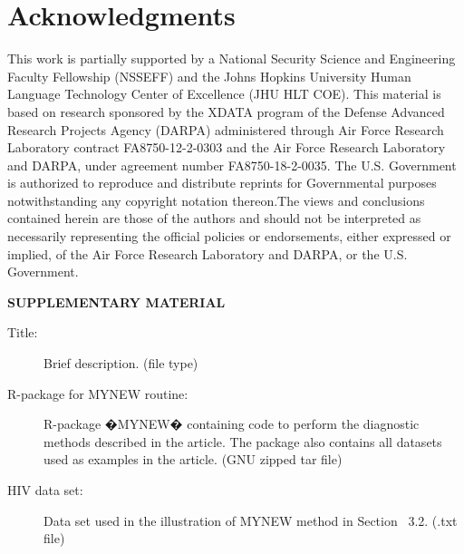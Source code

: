 \documentclass[12pt]{article}
\numberwithin{equation}{section}
\theoremstyle{definition}
\begin{document}
\section{Acknowledgments}
This work is partially supported by a
National Security Science and Engineering Faculty Fellowship (NSSEFF)
and the
Johns Hopkins University Human Language Technology Center of Excellence
(JHU HLT COE).
This material is based on research sponsored by the XDATA program of the
Defense Advanced Research Projects Agency (DARPA) administered through
Air Force Research Laboratory contract FA8750-12-2-0303 and the Air
Force Research Laboratory and DARPA, under agreement number FA8750-18-2-0035. 
The U.S. Government is authorized to reproduce and distribute reprints
for Governmental purposes notwithstanding any copyright notation
thereon.The views and conclusions contained herein are those of the
authors and should not be interpreted as necessarily representing the
official policies or endorsements, either expressed or implied, of the
Air Force Research Laboratory and DARPA, or the U.S. Government.
\newpage

\bigskip
\begin{center}
{\large\bf SUPPLEMENTARY MATERIAL}
\end{center}

\begin{description}

\item[Title:] Brief description. (file type)

\item[R-package for  MYNEW routine:] R-package �MYNEW� containing code to perform the diagnostic methods described in the article. The package also contains all datasets used as examples in the article. (GNU zipped tar file)

\item[HIV data set:] Data set used in the illustration of MYNEW method in Section~ 3.2. (.txt file)

\end{description}




\end{document}
